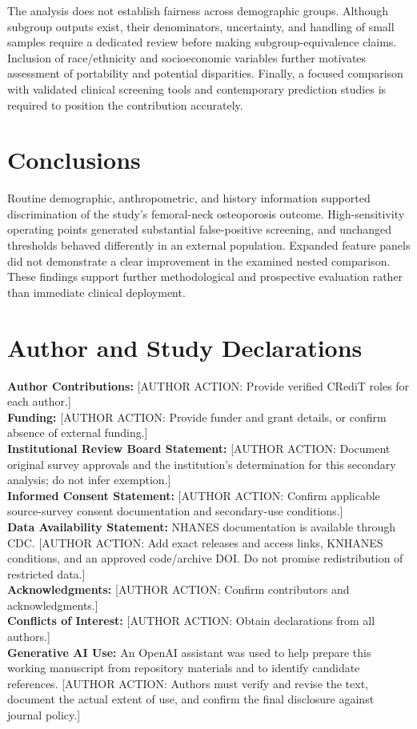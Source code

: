 \documentclass[11pt,a4paper]{article}
\newcommand{\pending}[1]{\textcolor{red!65!black}{[AUTHOR ACTION: #1]}}
\begin{document}
The analysis does not establish fairness across demographic groups. Although subgroup outputs exist, their denominators, uncertainty, and handling of small samples require a dedicated review before making subgroup-equivalence claims. Inclusion of race/ethnicity and socioeconomic variables further motivates assessment of portability and potential disparities. Finally, a focused comparison with validated clinical screening tools and contemporary prediction studies is required to position the contribution accurately.

\section{Conclusions}
Routine demographic, anthropometric, and history information supported discrimination of the study's femoral-neck osteoporosis outcome. High-sensitivity operating points generated substantial false-positive screening, and unchanged thresholds behaved differently in an external population. Expanded feature panels did not demonstrate a clear improvement in the examined nested comparison. These findings support further methodological and prospective evaluation rather than immediate clinical deployment.

\section*{Author and Study Declarations}
\noindent\textbf{Author Contributions:} \pending{Provide verified CRediT roles for each author.}\\
\textbf{Funding:} \pending{Provide funder and grant details, or confirm absence of external funding.}\\
\textbf{Institutional Review Board Statement:} \pending{Document original survey approvals and the institution's determination for this secondary analysis; do not infer exemption.}\\
\textbf{Informed Consent Statement:} \pending{Confirm applicable source-survey consent documentation and secondary-use conditions.}\\
\textbf{Data Availability Statement:} NHANES documentation is available through CDC. \pending{Add exact releases and access links, KNHANES conditions, and an approved code/archive DOI. Do not promise redistribution of restricted data.}\\
\textbf{Acknowledgments:} \pending{Confirm contributors and acknowledgments.}\\
\textbf{Conflicts of Interest:} \pending{Obtain declarations from all authors.}\\
\textbf{Generative AI Use:} An OpenAI assistant was used to help prepare this working manuscript from repository materials and to identify candidate references. \pending{Authors must verify and revise the text, document the actual extent of use, and confirm the final disclosure against journal policy.}
\end{document}
